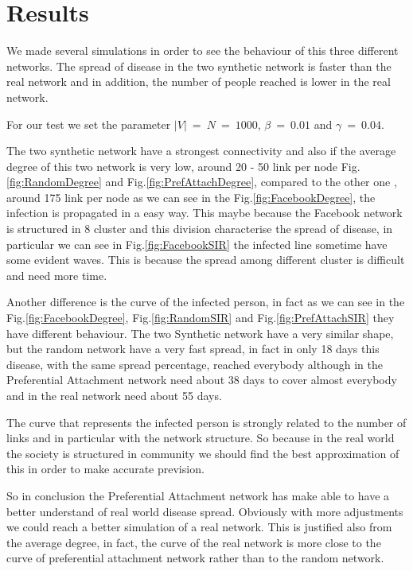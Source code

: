 
\section{Results}
    We made several simulations in order to see the behaviour of this three different networks.
    The spread of disease in the two synthetic network is faster than the real network and in addition, the number of people reached is lower in the real network.
    
    For our test we set the parameter $|V|~=~N~=~1000$, $\beta~=~0.01$ and $\gamma~=~0.04$.
    
    The two synthetic network have a strongest connectivity and also if the average degree of this two network is very low, around 20 - 50 link per node Fig.\ref{fig:RandomDegree} and Fig.\ref{fig:PrefAttachDegree}, compared to the other one , around 175 link per node as we can see in the Fig.\ref{fig:FacebookDegree}, the infection is propagated in a easy way.
    This maybe because the Facebook network is structured in 8 cluster and this division characterise the spread of disease, in particular we can see in Fig.\ref{fig:FacebookSIR} the infected line sometime have some evident waves. This is because the spread among different cluster is difficult and need more time.
   
    Another difference is the curve of the infected person, in fact as we can see in the Fig.\ref{fig:FacebookDegree}, Fig.\ref{fig:RandomSIR} and Fig.\ref{fig:PrefAttachSIR} they have different behaviour. The two Synthetic network have a very similar shape, but the random network have a very fast spread, in fact in only 18 days this disease, with the same spread percentage, reached everybody although in the Preferential Attachment network need about 38 days to cover almost everybody and in the real network need about 55 days.
    
    The curve that represents the infected person is strongly related to the number of links and in particular with the network structure. So because in the real world the society is structured in community we should find the best approximation of this in order to make accurate prevision.
    
    So in conclusion the Preferential Attachment network has make able to have a better understand of real world disease spread. Obviously with more adjustments we could reach a better simulation of a real network. This is justified also from the average degree, in fact, the curve of the real network is more close to the curve of preferential attachment network rather than to the random network.
    
